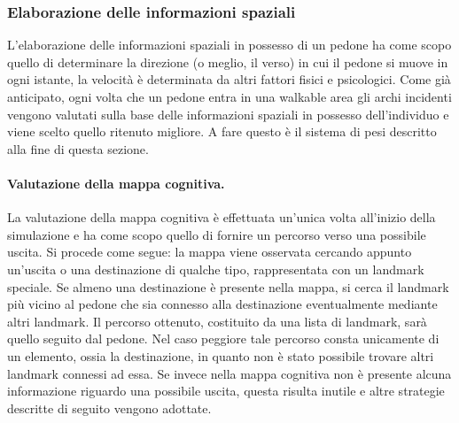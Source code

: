 \documentclass[12pt,a4paper,openright,oneside]{book}
\begin{document}
\subsubsection{Elaborazione delle informazioni spaziali}
L’elaborazione delle informazioni spaziali in possesso di un pedone ha come scopo quello di determinare la direzione (o meglio, il verso) in cui il pedone si muove in ogni istante, la velocità è determinata da altri fattori fisici e psicologici. Come già anticipato, ogni volta che un pedone entra in una walkable area gli archi incidenti vengono valutati sulla base delle informazioni spaziali in possesso dell’individuo e viene scelto quello ritenuto migliore. A fare questo è il sistema di pesi descritto alla fine di questa sezione.

\paragraph{Valutazione della mappa cognitiva.} La valutazione della mappa cognitiva è effettuata un’unica volta all’inizio della simulazione e ha come scopo quello di fornire un percorso verso una possibile uscita. Si procede come segue: la mappa viene osservata cercando appunto un’uscita o una destinazione di qualche tipo, rappresentata con un landmark speciale. Se almeno una destinazione è presente nella mappa, si cerca il landmark più vicino al pedone che sia connesso alla destinazione eventualmente mediante altri landmark. Il percorso ottenuto, costituito da una lista di landmark, sarà quello seguito dal pedone. Nel caso peggiore tale percorso consta unicamente di un elemento, ossia la destinazione, in quanto non è stato possibile trovare altri landmark connessi ad essa. Se invece nella mappa cognitiva non è presente alcuna informazione riguardo una possibile uscita, questa risulta inutile e altre strategie descritte di seguito vengono adottate.
\end{document}
